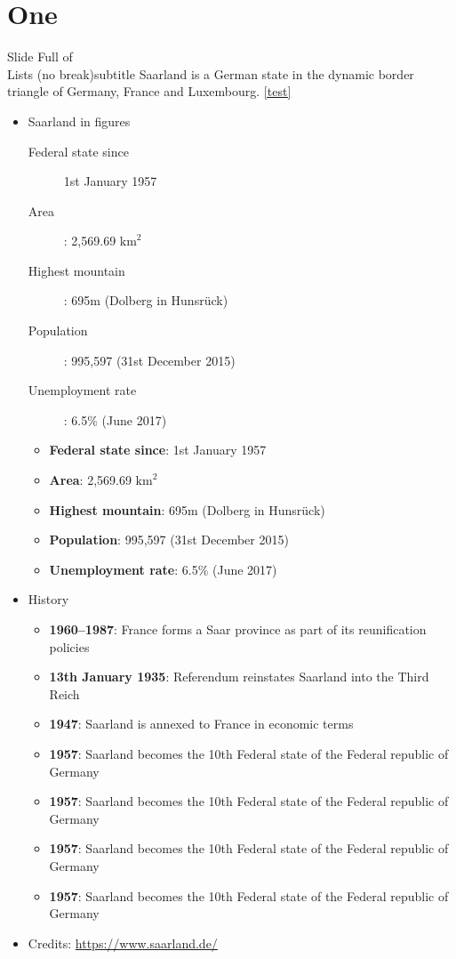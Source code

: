 \documentclass{corpborepres}
\begin{document}
	\section{One}

	\subtitleINline
	\begin{frame}{Slide Full of\\Lists (no break)}{subtitle}
	Saarland is a German state in the dynamic border triangle of Germany, France and Luxembourg.
	\cref{test}
		\begin{itemize}
			\item Saarland in figures
				\begin{description}
					\item[Federal state since] 1st January 1957
					\item[Area]: 2,569.69 $\text{km}^2$
					\item[Highest mountain]: 695m (Dolberg in Hunsrück)
					\item[Population]: 995,597 (31st December 2015)
					\item[Unemployment rate]: 6.5\% (June 2017)
				\end{description}

				\begin{itemize}
					\item \textbf{Federal state since}: 1st January 1957
					\item \textbf{Area}: 2,569.69 $\text{km}^2$
					\item \textbf{Highest mountain}: 695m (Dolberg in Hunsrück)
					\item \textbf{Population}: 995,597 (31st December 2015)
					\item \textbf{Unemployment rate}: 6.5\% (June 2017)
				\end{itemize}
			\item History
				\begin{itemize}
					\item \textbf{1960--1987}: France forms a Saar province as part of its reunification policies
					\item \textbf{13th January 1935}: Referendum reinstates Saarland into the Third Reich
					\item \textbf{1947}: Saarland is annexed to France in economic terms
					\item \textbf{1957}: Saarland becomes the 10th Federal state of the Federal republic of Germany
					\item \textbf{1957}: Saarland becomes the 10th Federal state of the Federal republic of Germany
					\item \textbf{1957}: Saarland becomes the 10th Federal state of the Federal republic of Germany
					\item \textbf{1957}: Saarland becomes the 10th Federal state of the Federal republic of Germany
				\end{itemize}
			\item Credits: \url{https://www.saarland.de/}
		\end{itemize}
	\end{frame}
	\subtitleNEWline
\end{document}
